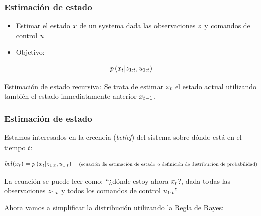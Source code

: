 \begin{frame}
    \frametitle{Estimación de estado}
    
    
    \begin{itemize}
        \item  Estimar el estado $x$ de un systema dada las observaciones $z$ y comandos de control $u$
        \item Objetivo:
    \end{itemize}
    
    \begin{equation}
        p\left(x_{t} | z_{1:t}, u_{1:t} \right)
    \end{equation}
    
    Estimación de estado recursiva: Se trata de estimar $x_{t}$ el estado actual utilizando también el estado inmediatamente anterior $x_{t-1}$.
\end{frame}


\begin{frame}
    \frametitle{Estimación de estado}
    
    Estamos interesados en la creencia (\emph{belief}) del sistema sobre dónde está en el tiempo $t$:
    
    \begin{equation*}
    bel(x_{t}) = p\left(x_{t} | z_{1:t}, u_{1:t} \right) \quad \text{\scriptsize (ecuación de estimación de estado o definición de distribución de probabilidad)}
    \end{equation*}
    
    La ecuación se puede leer como: ``¿dónde estoy ahora $x_{t}$?, dada todas las observaciones $z_{1:t}$ y todos los comandos de control $u_{1:t}$''
    
    \vspace{1cm}
    
    Ahora vamos a simplificar la distribución utilizando la Regla de Bayes:

\end{frame}



